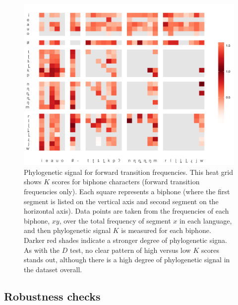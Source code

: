 \begin{figure}

{\centering \includegraphics[width=0.75\linewidth]{fig/k-swatch} 

}

\caption{Phylogenetic signal for forward transition frequencies. This heat grid shows $K$ scores for biphone characters (forward transition frequencies only). Each square represents a biphone (where the first segment is listed on the vertical axis and second segment on the horizontal axis). Data points are taken from the frequencies of each biphone, $xy$, over the total frequency of segment $x$ in each language, and then phylogenetic signal $K$ is measured for each biphone. Darker red shades indicate a stronger degree of phylogenetic signa. As with the $D$ test, no clear pattern of high versus low $K$ scores stands out, although there is a high degree of phylogenetic signal in the dataset overall.}\label{fig:k-swatch}
\end{figure}

\hypertarget{phy-sig-cont-robustness}{%
\subsection{Robustness checks}\label{phy-sig-cont-robustness}}

